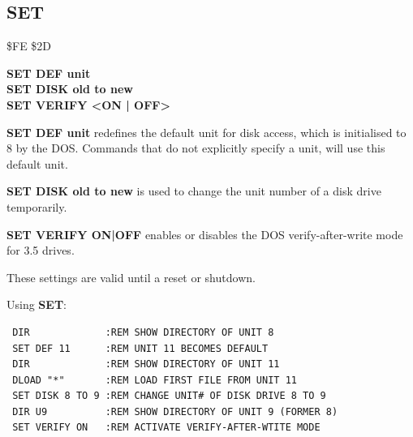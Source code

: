 
\newpage
\subsection{SET}
\begin{description}[leftmargin=2cm,style=nextline]
\item [Token:] \$FE \$2D
\item [Format:] {\bf SET DEF unit} \\
                {\bf SET DISK old to new} \\
                {\bf SET VERIFY <ON | OFF>}
\item [Usage:]  {\bf SET DEF unit} redefines the default unit
                for disk access, which is initialised to 8 by
                the DOS. Commands that do not explicitly
                specify a unit, will use this default unit.

                {\bf SET DISK old to new} is used to change
                the unit number of a disk drive temporarily.

                {\bf SET VERIFY ON|OFF} enables or disables
                the DOS verify-after-write mode for
                3.5 drives.

\item [Remarks:] These settings are valid until a reset
                 or shutdown.

\item [Examples:] Using {\bf SET}:
\begin{tcolorbox}[colback=black,coltext=white]
\verbatimfont{\codefont}
\begin{verbatim}
 DIR             :REM SHOW DIRECTORY OF UNIT 8
 SET DEF 11      :REM UNIT 11 BECOMES DEFAULT
 DIR             :REM SHOW DIRECTORY OF UNIT 11
 DLOAD "*"       :REM LOAD FIRST FILE FROM UNIT 11
 SET DISK 8 TO 9 :REM CHANGE UNIT# OF DISK DRIVE 8 TO 9
 DIR U9          :REM SHOW DIRECTORY OF UNIT 9 (FORMER 8)
 SET VERIFY ON   :REM ACTIVATE VERIFY-AFTER-WTITE MODE
\end{verbatim}
\end{tcolorbox}
\end{description}


\newpage
